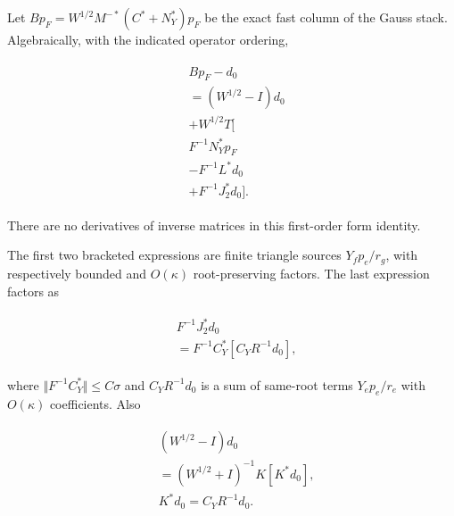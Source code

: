 Let \(B p_{F}=W^{1/2} M^{-*}(C^{*}+N_{Y}^{*})p_{F}\) be the exact fast
column of the Gauss stack. Algebraically, with the indicated operator
ordering,

\begin{gather*}
\begin{aligned}
& B p_{F}-d_{0} \\
& =(W^{1/2}-I)d_{0} \\
& +W^{1/2}T[ \\
& F^{-1} N_{Y}^{*} p_{F} \\
& -F^{-1} L^{*} d_{0} \\
& +F^{-1} J_{2}^{*} d_{0}].
\end{aligned}\tag{5}
\end{gather*}

There are no derivatives of inverse matrices in this first-order form
identity.

The first two bracketed expressions are finite triangle sources
\(Y_{f} p_{e}/r_{g}\), with respectively bounded and \(O(\kappa )\)
root-preserving factors. The last expression factors as

\begin{gather*}
\begin{aligned}
& F^{-1} J_{2}^{*} d_{0} \\
& =F^{-1} C_{Y}^{*} [C_{Y} R^{-1} d_{0}],
\end{aligned}\tag{6}
\end{gather*}

where \(\Vert F^{-1} C_{Y}^{*}\Vert \le C \sigma\) and
\(C_{Y} R^{-1} d_{0}\) is a sum of same-root terms \(Y_{e} p_{e}/r_{e}\)
with \(O(\kappa )\) coefficients. Also

\begin{gather*}
\begin{aligned}
& (W^{1/2}-I)d_{0} \\
& =(W^{1/2}+I)^{-1} K [K^{*} d_{0}], \\
& K^{*} d_{0}=C_{Y} R^{-1} d_{0}.
\end{aligned}\tag{7}
\end{gather*}

